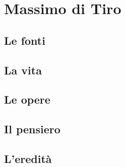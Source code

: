 \chapter{Massimo di Tiro}

\section{Le fonti}

\section{La vita}

\section{Le opere}

\section{Il pensiero}

\section{L'eredità}

